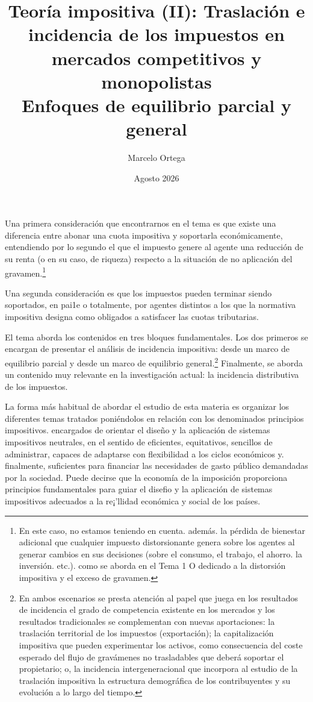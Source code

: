 \documentclass[10pt,a4paper]{article}
\title{Teoría impositiva (II): Traslación e incidencia de los impuestos en mercados competitivos y monopolistas\\
\large Enfoques de equilibrio parcial y general}
\author{Marcelo Ortega}
\date{Agosto 2026}
\newcommand{\puntosclave}[1]{%
  \begin{tcolorbox}[
    colframe=black,
    title={Puntos clave},
    before upper={\setlength{\parindent}{0.5cm}\setlength{\parskip}{0.5\baselineskip}}
  ]
  #1
  \end{tcolorbox}
}
\begin{document}
\maketitle
\newpage

\puntosclave{ %
     Una primera consideración que encontrarnos en el tema es que existe una diferencia entre abonar una cuota impositiva y soportarla económicamente, entendiendo por lo segundo el que el impuesto genere al agente una reducción de su renta (o en su caso, de riqueza) respecto a la situación de no aplicación del gravamen.\footnote{%
         En este caso, no estamos teniendo en cuenta. además. la pérdida de bienestar adicional que cualquier impuesto distorsionante genera sobre los agentes al generar cambios en sus decisiones (sobre el consumo, el trabajo, el ahorro. la inversión. etc.). como se aborda en el Tema 1 O dedicado a la distorsión impositiva y el exceso de gravamen.
     }

     Una segunda consideración es que los impuestos pueden terminar siendo soportados, en pai1e o totalmente, por agentes distintos a los que la normativa impositiva designa como obligados a satisfacer las cuotas tributarias.

     El tema aborda los contenidos en tres bloques fundamentales. Los dos primeros se encargan de presentar el análisis de incidencia  impositiva: desde un marco de equilibrio parcial y desde un marco de equilibrio general.\footnote{%
         En ambos escenarios se presta atención al papel que juega en los resultados de incidencia el grado de competencia existente en los mercados y los resultados tradicionales se complementan con nuevas aportaciones: la traslación territorial de los impuestos (exportación); la capitalización impositiva que pueden experimentar los activos, como consecuencia del coste esperado del flujo de gravámenes no trasladables que deberá soportar el propietario; o, la incidencia intergeneracional que incorpora al estudio de la traslación impositiva la estructura demográfica de los contribuyentes y su evolución a lo largo del tiempo.
     } Finalmente, se aborda un contenido muy relevante en la investigación actual: la incidencia distributiva de los impuestos. 

     La forma más habitual de abordar el estudio de esta materia es organizar los diferentes temas tratados poniéndolos en relación con los denominados principios impositivos. encargados de orientar el diseño y la aplicación de sistemas impositivos neutrales, en el sentido de eficientes, equitativos, sencillos de administrar, capaces de adaptarse con flexibilidad a los ciclos económicos y. finalmente, suficientes para financiar las necesidades de gasto público demandadas por la sociedad. Puede decirse que la economía de la imposición proporciona principios fundamentales para guiar el disefio y la aplicación de sistemas impositivos adecuados a la re¡'llidad económica y social de los países.
    }
\vspace{1cm}
\end{document}
